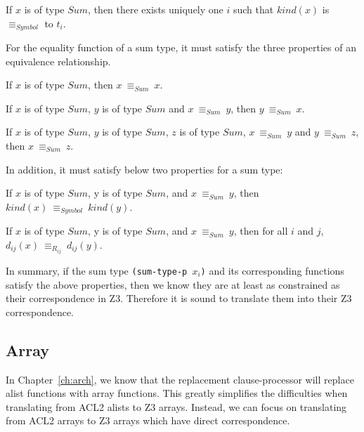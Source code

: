 \begin{property}
  If $x$ is of type $Sum$, then there exists uniquely one $i$ such that
  $kind(x)$ is $\equiv_{Symbol}$ to $t_i$.
\end{property}

\noindent For the equality function of a sum type, it must satisfy the three
properties of an equivalence relationship.

\begin{property}
  If $x$ is of type $Sum$, then $x\: \equiv_{Sum}\: x$.
\end{property}

\begin{property}
  If $x$ is of type $Sum$, $y$ is of type $Sum$ and $x\: \equiv_{Sum}\: y$, then
  $y\: \equiv_{Sum}\: x$. 
\end{property}

\begin{property}
  If $x$ is of type $Sum$, $y$ is of type $Sum$, $z$ is of type $Sum$,
  $x\: \equiv_{Sum}\: y$ and $y\: \equiv_{Sum}\: z$, then $x\: \equiv_{Sum}\: z$.
\end{property}

\noindent In addition, it must satisfy below two properties for a sum type:

\begin{property}
  If $x$ is of type $Sum$, y is of type $Sum$, and $x\: \equiv_{Sum}\: y$, then
  $kind(x)\: \equiv_{Symbol}\: kind(y)$.
\end{property}

\begin{property}
  If $x$ is of type $Sum$, y is of type $Sum$, and $x\: \equiv_{Sum}\: y$,
  then for all $i$ and $j$, $d_{ij}(x)\: \equiv_{R_{ij}}\: d_{ij}(y)$.
\end{property}

In summary, if the sum type \texttt{(sum-type-p $x_i$)} and its corresponding
functions satisfy the above properties, then we know they are at least as
constrained as their correspondence in Z3. Therefore it is sound to translate
them into their Z3 correspondence.

\subsection{Array}\label{subsec:soundalisttype}
In Chapter~\ref{ch:arch}, we know that the replacement clause-processor will
replace alist functions with array functions. This greatly simplifies the
difficulties when translating from ACL2 alists to Z3 arrays. Instead, we can
focus on translating from ACL2 arrays to Z3 arrays which have direct
correspondence.


